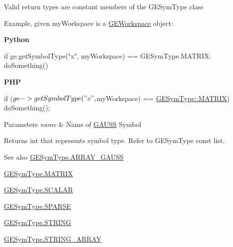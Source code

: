 Valid return types are constant members of the G\+E\+Sym\+Type class

Example, given {\ttfamily my\+Workspace} is a \hyperlink{class_g_e_workspace}{G\+E\+Workspace} object\+:

{\bfseries Python} 
\begin{DoxyCode}
\textcolor{keywordflow}{if} ge.getSymbolType(\textcolor{stringliteral}{"x"}, myWorkspace) == GESymType.MATRIX:
    doSomething()
\end{DoxyCode}


{\bfseries P\+HP} 
\begin{DoxyCode}
\textcolor{keywordflow}{if} ($ge->getSymbolType(\textcolor{stringliteral}{"x"}, $myWorkspace) == \hyperlink{struct_g_e_sym_type__s_a3874c4c2df1ed454c13722031e582f66}{GESymType::MATRIX})
    doSomething();
\end{DoxyCode}



\begin{DoxyParams}{Parameters}
{\em name} & Name of \hyperlink{class_g_a_u_s_s}{G\+A\+U\+SS} Symbol \\
\hline
\end{DoxyParams}
\begin{DoxyReturn}{Returns}
int that represents symbol type. Refer to G\+E\+Sym\+Type const list.
\end{DoxyReturn}
\begin{DoxySeeAlso}{See also}
\hyperlink{struct_g_e_sym_type__s_ae49660fdf27d7d165463abb2ccc941e4}{G\+E\+Sym\+Type.\+A\+R\+R\+A\+Y\+\_\+\+G\+A\+U\+SS} 

\hyperlink{struct_g_e_sym_type__s_a3874c4c2df1ed454c13722031e582f66}{G\+E\+Sym\+Type.\+M\+A\+T\+R\+IX} 

\hyperlink{struct_g_e_sym_type__s_a4868e0d2833270b164c4a78b497f4fdc}{G\+E\+Sym\+Type.\+S\+C\+A\+L\+AR} 

\hyperlink{struct_g_e_sym_type__s_a17bff9bfcefd9f4c639d20d256f20a7d}{G\+E\+Sym\+Type.\+S\+P\+A\+R\+SE} 

\hyperlink{struct_g_e_sym_type__s_a0e719c96f22a8453e460f7d87a09696a}{G\+E\+Sym\+Type.\+S\+T\+R\+I\+NG} 

\hyperlink{struct_g_e_sym_type__s_a8b841bad6dacbbacf0d423219bd08a98}{G\+E\+Sym\+Type.\+S\+T\+R\+I\+N\+G\+\_\+\+A\+R\+R\+AY} 
\end{DoxySeeAlso}
\mbox{\label{class_g_a_u_s_s_a5b2fb78a745be14e4e66a4fd5c5388eb}} 
